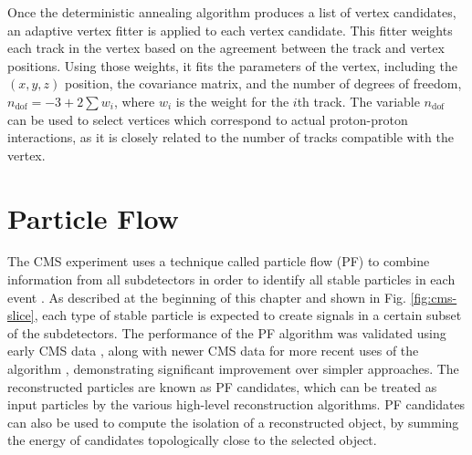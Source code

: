 Once the deterministic annealing algorithm produces a list of vertex candidates, an adaptive vertex fitter is applied to each vertex candidate. This fitter weights each track in the vertex based on the agreement between the track and vertex positions. Using those weights, it fits the parameters of the vertex, including the $(x,y,z)$ position, the covariance matrix, and the number of degrees of freedom, $n_{\text{dof}} = -3 + 2 \sum{w_i}$, where $w_i$ is the weight for the $i$th track. The variable $n_{\text{dof}}$ can be used to select vertices which correspond to actual proton-proton interactions, as it is closely related to the number of tracks compatible with the vertex.


\section{Particle Flow
\label{sec:particle-flow}}

The CMS experiment uses a technique called particle flow (PF) to combine information from all subdetectors in order to identify all stable particles in each event \cite{CMS-PAS-PFT-09-001}. As described at the beginning of this chapter and shown in Fig. \ref{fig:cms-slice}, each type of stable particle is expected to create signals in a certain subset of the subdetectors. The performance of the PF algorithm was validated using early CMS data \cite{CMS-PAS-PFT-10-002,CMS-PAS-PFT-10-003}, along with newer CMS data for more recent uses of the algorithm \cite{Beaudette:2014cea}, demonstrating significant improvement over simpler approaches. The reconstructed particles are known as PF candidates, which can be treated as input particles by the various high-level reconstruction algorithms. PF candidates can also be used to compute the isolation of a reconstructed object, by summing the energy of candidates topologically close to the selected object.

